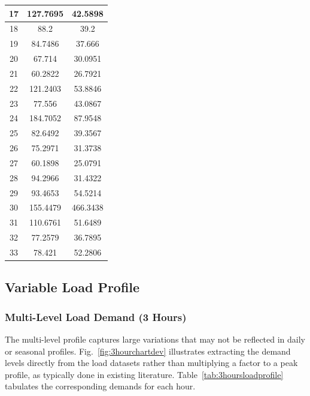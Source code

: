 \documentclass[12pt]{article}
\begin{document}
\begin{table}[htbp]
\begin{tabular}{|c|c|c|}
				17           & 127.7695        & 42.5898           \\ \hline
				18           & 88.2            & 39.2              \\ \hline
				19           & 84.7486         & 37.666            \\ \hline
				20           & 67.714          & 30.0951           \\ \hline
				21           & 60.2822         & 26.7921           \\ \hline
				22           & 121.2403        & 53.8846           \\ \hline
				23           & 77.556          & 43.0867           \\ \hline
				24           & 184.7052        & 87.9548           \\ \hline
				25           & 82.6492         & 39.3567           \\ \hline
				26           & 75.2971         & 31.3738           \\ \hline
				27           & 60.1898         & 25.0791           \\ \hline
				28           & 94.2966         & 31.4322           \\ \hline
				29           & 93.4653         & 54.5214           \\ \hline
				30           & 155.4479        & 466.3438          \\ \hline
				31           & 110.6761        & 51.6489           \\ \hline
				32           & 77.2579         & 36.7895           \\ \hline
				33           & 78.421          & 52.2806           \\ \hline
			\end{tabular}
	\end{table}
	
	
	\subsection{Variable Load Profile}
	
	\subsubsection{Multi-Level Load Demand (3 Hours)}
	The multi-level profile captures large variations that may not be reflected in daily or seasonal profiles. Fig.~\ref{fig:3hourchartdev} illustrates extracting the demand levels directly from the load datasets rather than multiplying a factor to a peak profile, as typically done in existing literature. Table~\ref{tab:3hoursloadprofile} tabulates the corresponding demands for each hour.
	
\end{document}
